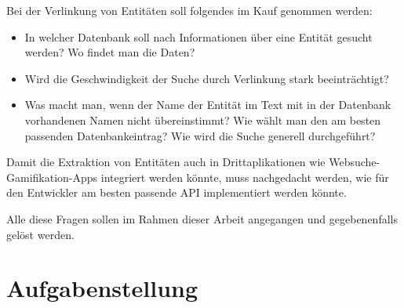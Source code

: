 Bei der Verlinkung von Entitäten soll folgendes im Kauf genommen werden:
\begin{itemize}
\item In welcher Datenbank soll nach Informationen über eine Entität gesucht werden? Wo findet man die Daten?
\item Wird die Geschwindigkeit der Suche durch Verlinkung stark beeinträchtigt?
\item Was macht man, wenn der Name der Entität im Text mit in der Datenbank vorhandenen Namen nicht übereinstimmt? Wie wählt man den am besten passenden Datenbankeintrag? Wie wird die Suche generell durchgeführt?
\end{itemize}

Damit die Extraktion von Entitäten auch in Drittaplikationen wie Websuche-Gamifikation-Apps\cite{Karatassis:15} integriert werden könnte, muss nachgedacht werden, wie für den Entwickler am besten passende API implementiert werden könnte.

Alle diese Fragen sollen im Rahmen dieser Arbeit angegangen und gegebenenfalls gelöst werden.

\section{Aufgabenstellung}
\label{sec:Aufgabenstellung}
